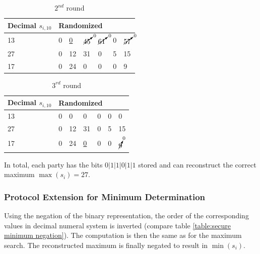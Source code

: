 		\begin{table}[!htb]
			\centering
			\caption{$2^{nd}$ round} \label{table:secure maximum p1 not maximum}
			\begin{tabular}{|l|l|l|l|l|l|l|}
				\hline
				Decimal $s_{i,10}$ & \multicolumn{6}{l|}{Randomized} \\ \hline
				13                 & 0    & \underline{0}    & $\cancelto{0}{45}$    & $\cancelto{0}{61}$    & 0   & $\cancelto{0}{57}$   \\ \hline
				27                 & 0    & 12    & 31    & 0    & 5   & 15   \\ \hline
				17                 & 0    & 24    & 0    & 0    & 0   & 9   \\ \hline
			\end{tabular}
		\end{table}

		\begin{table}[!htb]
			\centering
			\caption{$3^{rd}$ round} \label{table:secure maximum p3 not maximum}
			\begin{tabular}{|l|l|l|l|l|l|l|}
				\hline
				Decimal $s_{i,10}$ & \multicolumn{6}{l|}{Randomized} \\ \hline
				13                 & 0    & 0    & 0    & 0    & 0   & 0   \\ \hline
				27                 & 0    & 12    & 31    & 0    & 5   & 15   \\ \hline
				17                 & 0    & 24    & \underline{0}    & 0    & 0   & $\cancelto{0}{9}$   \\ \hline
			\end{tabular}
		\end{table}

		In total, each party has the bits $0|1|1|0|1|1$ stored and can reconstruct the correct maximum $\max(s_i)=27$.
		
		\subsubsection{Protocol Extension for Minimum Determination} \label{Protocol Extension for Minimum Determination}
		
		Using the negation of the binary representation, the order of the corresponding values in decimal numeral system is inverted (compare table \ref{table:secure minimum negation}). The computation is then the same as for the maximum search. The reconstructed maximum is finally negated to result in $\min(s_i)$.
		
